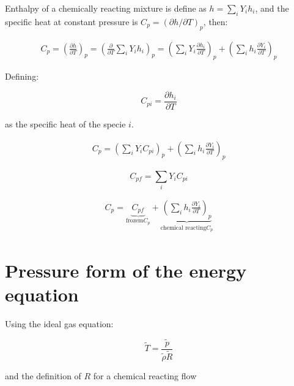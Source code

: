 \documentclass[preprint,12pt,authoryear]{elsarticle}
\begin{document}
Enthalpy of a chemically reacting mixture  
is define as $h=\sum_iY_ih_i$, and 
the specific heat  at constant pressure is 
$C_p=\left(\partial{h}/\partial{T}\right)_p$,
then:

\begin{equation}
\begin{split}
C_p
=
\left(\frac{\partial{h}}{\partial{T}}\right)_p
=
\left(\frac{\partial}{\partial{T}}\sum_i Y_ih_i\right)_p
=
\left(\sum_i Y_i\frac{\partial{h_i}}{\partial{T}}\right)_p
+
\left(\sum_i h_i\frac{\partial{Y_i}}{\partial{T}}\right)_p
\end{split}
\end{equation}

Defining: 

\begin{equation}
C_{pi}=\frac{\partial{h_i}}{\partial{T}}
\end{equation}

as the specific heat of the specie $i$.

\begin{equation}
\begin{split}
C_p
=
\left(\sum_i Y_iC_{pi}\right)_p
+
\left(\sum_i h_i\frac{\partial{Y_i}}{\partial{T}}\right)_p
\end{split}
\end{equation}

\begin{equation}
C_{pf}=\sum_iY_iC_{pi}
\end{equation}

\begin{equation}
\begin{split}
C_p
=
\underbrace{
C_{pf}
	    }_{\text{frozem}C_p}
+
\underbrace{
		\left(\sum_i h_i\frac{\partial{Y_i}}{\partial{T}}\right)_p
}_{\text{chemical reacting} C_p}
\end{split}
\end{equation}


\section{Pressure form of the energy equation}


Using the ideal gas equation:

\begin{equation}
        \tilde{T}=\frac{\tilde{p}}{\tilde{\rho}\tilde{R}}
\end{equation}

and the definition of $R$ for a chemical reacting flow 
\end{document}
